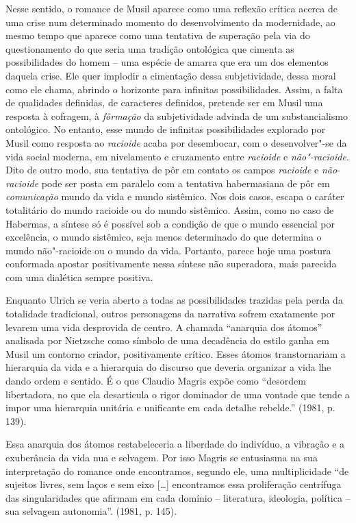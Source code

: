Nesse sentido, o romance de Musil aparece como uma reflexão crítica
acerca de uma crise num determinado momento do desenvolvimento da
modernidade, ao mesmo tempo que aparece como uma tentativa de superação
pela via do questionamento do que seria uma tradição ontológica que
cimenta as possibilidades do homem -- uma espécie de amarra que era um
dos elementos daquela crise. Ele quer implodir a cimentação dessa
subjetividade, dessa moral como ele chama, abrindo o horizonte para
infinitas possibilidades. Assim, a falta de qualidades definidas, de
caracteres definidos, pretende ser em Musil uma resposta à cofragem, à
\emph{fôrmação} da subjetividade advinda de um substancialismo
ontológico. No entanto, esse mundo de infinitas possibilidades explorado
por Musil como resposta ao \emph{racioide} acaba por desembocar, com o
desenvolver"-se da vida social moderna, em nivelamento e cruzamento entre
\emph{racioide} e \emph{não"-racioide}. Dito de outro modo, sua tentativa
de pôr em contato os campos \emph{racioide} e \emph{não}-\emph{racioide}
pode ser posta em paralelo com a tentativa habermasiana de pôr em
\emph{comunicação} mundo da vida e mundo sistêmico. Nos dois casos,
escapa o caráter totalitário do mundo racioide ou do mundo sistêmico.
Assim, como no caso de Habermas, a síntese só é possível sob a condição
de que o mundo essencial por excelência, o mundo sistêmico, seja menos
determinado do que determina o mundo não"-racioide ou o mundo da vida.
Portanto, parece hoje uma postura conformada apostar positivamente nessa
síntese não superadora, mais parecida com uma dialética sempre positiva.

Enquanto Ulrich se veria aberto a todas as possibilidades trazidas pela
perda da totalidade tradicional, outros personagens da narrativa sofrem
exatamente por levarem uma vida desprovida de centro. A chamada
``anarquia dos átomos'' analisada por Nietzsche como símbolo de uma
decadência do estilo ganha em Musil um contorno criador, positivamente
crítico. Esses átomos transtornariam a hierarquia da vida e a hierarquia
do discurso que deveria organizar a vida lhe dando ordem e sentido. É o
que Claudio Magris expõe como ``desordem libertadora, no que ela
desarticula o rigor dominador de uma vontade que tende a impor uma
hierarquia unitária e unificante em cada detalhe rebelde.'' (1981, p.
139).

Essa anarquia dos átomos restabeleceria a liberdade do indivíduo, a
vibração e a exuberância da vida nua e selvagem. Por isso Magris se
entusiasma na sua interpretação do romance onde encontramos, segundo
ele, uma multiplicidade ``de sujeitos livres, sem laços e sem eixo
[\ldots{}] encontramos essa proliferação centrífuga das
singularidades que afirmam em cada domínio -- literatura, ideologia,
política -- sua selvagem autonomia''. (1981, p. 145).

